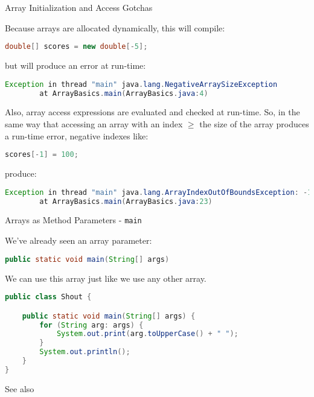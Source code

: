 \documentclass{beamer}
\begin{document}
\begin{frame}[fragile]{Array Initialization and Access Gotchas}


Because arrays are allocated dynamically, this will compile:
\begin{lstlisting}[language=Java]
double[] scores = new double[-5];
\end{lstlisting}
but will produce an error at run-time:
\begin{lstlisting}[language=Java]
Exception in thread "main" java.lang.NegativeArraySizeException
        at ArrayBasics.main(ArrayBasics.java:4)
\end{lstlisting}

Also, array access expressions are evaluated and checked at run-time.  So, in the same way that accessing an array with an index $\ge$ the size of the array produces a run-time error, negative indexes like:

\begin{lstlisting}[language=Java]
scores[-1] = 100;
\end{lstlisting}
produce:
\begin{lstlisting}[language=Java]
Exception in thread "main" java.lang.ArrayIndexOutOfBoundsException: -1
        at ArrayBasics.main(ArrayBasics.java:23)
\end{lstlisting}
\end{frame}

\begin{frame}[fragile]{Arrays as Method Parameters - {\tt main}}


We've already seen an array parameter:
\begin{lstlisting}[language=Java]
public static void main(String[] args)
\end{lstlisting}

We can use this array just like we use any other array.
\begin{lstlisting}[language=Java]
public class Shout {

    public static void main(String[] args) {
        for (String arg: args) {
            System.out.print(arg.toUpperCase() + " ");
        }
        System.out.println();
    }
}
\end{lstlisting}
See also 
\end{frame}
\end{document}
